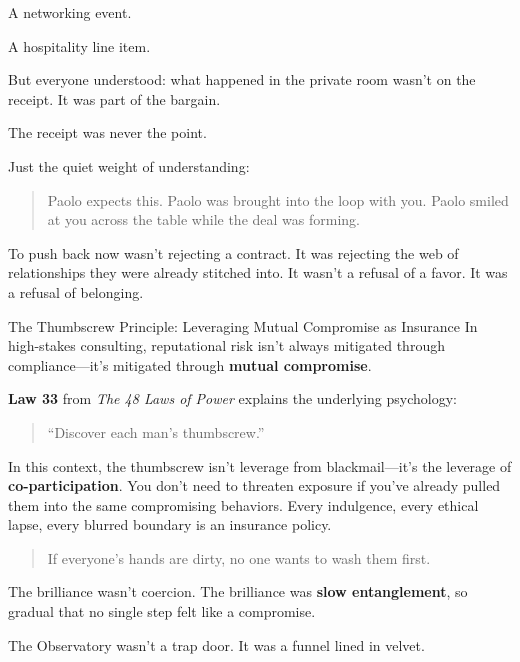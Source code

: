 A networking event.  

A hospitality line item.

But everyone understood:  what happened in the private room wasn’t on the receipt.  It was part of the bargain.

The receipt was never the point.

Just the quiet weight of understanding:  

\begin{quote}
Paolo expects this. Paolo was brought into the loop with you. Paolo smiled at you across the table while the deal was forming.
\end{quote}

To push back now wasn’t rejecting a contract.  
It was rejecting the web of relationships they were already stitched into.  
It wasn’t a refusal of a favor.  
It was a refusal of belonging.

\medskip

\begin{HistoricalSidebar}{The Thumbscrew Principle: Leveraging Mutual Compromise as Insurance}
In high-stakes consulting, reputational risk isn’t always mitigated through compliance—it’s mitigated through \textbf{mutual compromise}.  

\medskip

\textbf{Law 33} from \textit{The 48 Laws of Power} explains the underlying psychology:  

\begin{quote}
“Discover each man’s thumbscrew.”  
\end{quote}

In this context, the thumbscrew isn’t leverage from blackmail—it’s the leverage of \textbf{co-participation}. You don’t need to threaten exposure if you’ve already pulled them into the same compromising behaviors. Every indulgence, every ethical lapse, every blurred boundary is an insurance policy.  

\begin{quote}
If everyone’s hands are dirty, no one wants to wash them first.
\end{quote}
\end{HistoricalSidebar}

\medskip


The brilliance wasn’t coercion.  The brilliance was \textbf{slow entanglement}, so gradual that no single step felt like a compromise.

The Observatory wasn’t a trap door.  It was a funnel lined in velvet.

